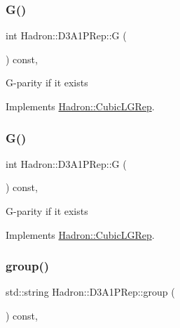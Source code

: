 \subsubsection{\texorpdfstring{G()}{G()}\hspace{0.1cm}{\footnotesize\ttfamily [2/3]}}
{\footnotesize\ttfamily int Hadron\+::\+D3\+A1\+P\+Rep\+::G (\begin{DoxyParamCaption}{ }\end{DoxyParamCaption}) const\hspace{0.3cm}{\ttfamily [inline]}, {\ttfamily [virtual]}}

G-\/parity if it exists 

Implements \mbox{\hyperlink{structHadron_1_1CubicLGRep_ace26f7b2d55e3a668a14cb9026da5231}{Hadron\+::\+Cubic\+L\+G\+Rep}}.

\mbox{\label{structHadron_1_1D3A1PRep_a5598aa20a6886bf4d30c2610d30e4836}} 
\subsubsection{\texorpdfstring{G()}{G()}\hspace{0.1cm}{\footnotesize\ttfamily [3/3]}}
{\footnotesize\ttfamily int Hadron\+::\+D3\+A1\+P\+Rep\+::G (\begin{DoxyParamCaption}{ }\end{DoxyParamCaption}) const\hspace{0.3cm}{\ttfamily [inline]}, {\ttfamily [virtual]}}

G-\/parity if it exists 

Implements \mbox{\hyperlink{structHadron_1_1CubicLGRep_ace26f7b2d55e3a668a14cb9026da5231}{Hadron\+::\+Cubic\+L\+G\+Rep}}.

\mbox{\label{structHadron_1_1D3A1PRep_a1c8c6294dd6e9886efa5f3862c77cbcc}} 
\subsubsection{\texorpdfstring{group()}{group()}\hspace{0.1cm}{\footnotesize\ttfamily [1/3]}}
{\footnotesize\ttfamily std\+::string Hadron\+::\+D3\+A1\+P\+Rep\+::group (\begin{DoxyParamCaption}{ }\end{DoxyParamCaption}) const\hspace{0.3cm}{\ttfamily [inline]}, {\ttfamily [virtual]}}

